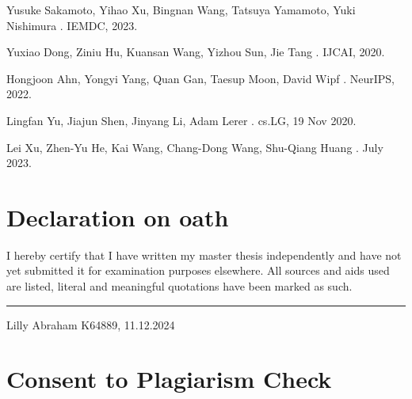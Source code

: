 \documentclass{report} %
\begin{document}
\begin{thebibliography}{00}
    \newblock Yusuke Sakamoto, Yihao Xu, Bingnan Wang, Tatsuya Yamamoto, Yuki Nishimura
    .
    \newblock IEMDC, 2023.

    \newblock Yuxiao Dong, Ziniu Hu, Kuansan Wang, Yizhou Sun, Jie Tang
    .
    \newblock IJCAI, 2020.

    \newblock Hongjoon Ahn, Yongyi Yang, Quan Gan, Taesup Moon, David Wipf
    .
    \newblock NeurIPS, 2022.

    \newblock Lingfan Yu, Jiajun Shen, Jinyang Li, Adam Lerer
    .
    \newblock cs.LG, 19 Nov 2020.

    \newblock Lei Xu, Zhen-Yu He, Kai Wang, Chang-Dong Wang, Shu-Qiang Huang
    .
     July 2023.

\end{thebibliography}


\chapter*{Declaration on oath}

\vspace{1cm}

\noindent I hereby certify that I have written my master thesis independently and have not yet submitted it for examination purposes elsewhere. 
All sources and aids used are listed, literal and meaningful quotations have been marked as such.

\vspace{3cm}
\hfill\rule{15cm}{0.4pt} 

\begin{center}
    Lilly Abraham K64889, 11.12.2024 
\end{center}

\newpage 

\chapter*{Consent to Plagiarism Check}
\vspace{1cm}
\end{document}
